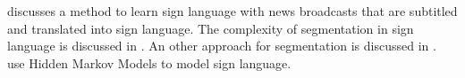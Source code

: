\citep{Buehler2009} discusses a method to learn sign language with news broadcasts that are subtitled and translated into sign language. The complexity of segmentation in sign language is discussed in \citep{RichardBowden2004}. An other approach for segmentation is discussed in \citep{Cooper2007}. \citep{starner1998,Vogler1999} use Hidden Markov Models to model sign language.





